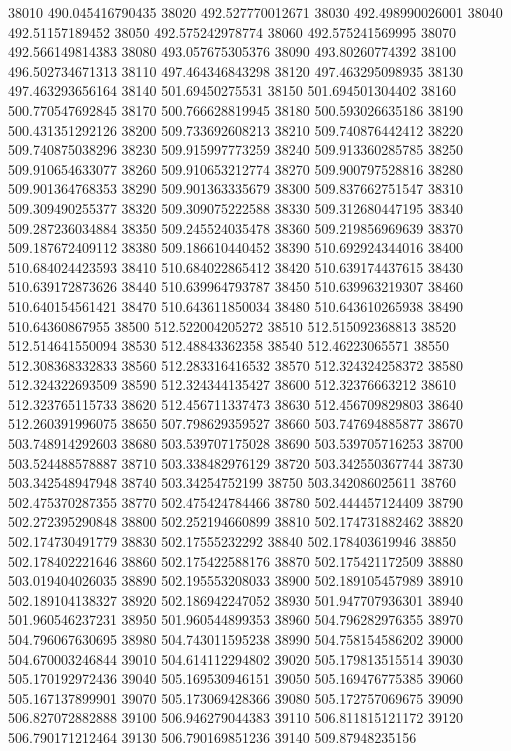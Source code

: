 {38010 490.045416790435
38020 492.527770012671
38030 492.498990026001
38040 492.51157189452
38050 492.575242978774
38060 492.575241569995
38070 492.566149814383
38080 493.057675305376
38090 493.80260774392
38100 496.502734671313
38110 497.464346843298
38120 497.463295098935
38130 497.463293656164
38140 501.69450275531
38150 501.694501304402
38160 500.770547692845
38170 500.766628819945
38180 500.593026635186
38190 500.431351292126
38200 509.733692608213
38210 509.740876442412
38220 509.740875038296
38230 509.915997773259
38240 509.913360285785
38250 509.910654633077
38260 509.910653212774
38270 509.900797528816
38280 509.901364768353
38290 509.901363335679
38300 509.837662751547
38310 509.309490255377
38320 509.309075222588
38330 509.312680447195
38340 509.287236034884
38350 509.245524035478
38360 509.219856969639
38370 509.187672409112
38380 509.186610440452
38390 510.692924344016
38400 510.684024423593
38410 510.684022865412
38420 510.639174437615
38430 510.639172873626
38440 510.639964793787
38450 510.639963219307
38460 510.640154561421
38470 510.643611850034
38480 510.643610265938
38490 510.64360867955
38500 512.522004205272
38510 512.515092368813
38520 512.514641550094
38530 512.48843362358
38540 512.46223065571
38550 512.308368332833
38560 512.283316416532
38570 512.324324258372
38580 512.324322693509
38590 512.324344135427
38600 512.32376663212
38610 512.323765115733
38620 512.456711337473
38630 512.456709829803
38640 512.260391996075
38650 507.798629359527
38660 503.747694885877
38670 503.748914292603
38680 503.539707175028
38690 503.539705716253
38700 503.524488578887
38710 503.338482976129
38720 503.342550367744
38730 503.342548947948
38740 503.34254752199
38750 503.342086025611
38760 502.475370287355
38770 502.475424784466
38780 502.444457124409
38790 502.272395290848
38800 502.252194660899
38810 502.174731882462
38820 502.174730491779
38830 502.17555232292
38840 502.178403619946
38850 502.178402221646
38860 502.175422588176
38870 502.175421172509
38880 503.019404026035
38890 502.195553208033
38900 502.189105457989
38910 502.189104138327
38920 502.186942247052
38930 501.947707936301
38940 501.960546237231
38950 501.960544899353
38960 504.796282976355
38970 504.796067630695
38980 504.743011595238
38990 504.758154586202
39000 504.670003246844
39010 504.614112294802
39020 505.179813515514
39030 505.170192972436
39040 505.169530946151
39050 505.169476775385
39060 505.167137899901
39070 505.173069428366
39080 505.172757069675
39090 506.827072882888
39100 506.946279044383
39110 506.811815121172
39120 506.790171212464
39130 506.790169851236
39140 509.87948235156
}
